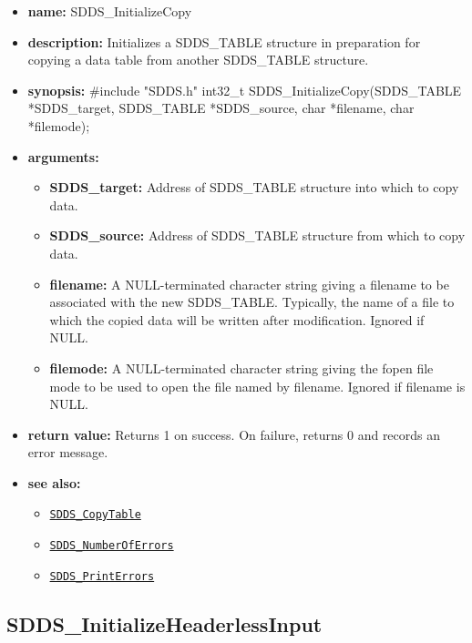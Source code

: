 \documentclass[11pt]{article}
\newcommand{\progref}[1]{\hyperref[SDDS_#1]{\tt SDDS\_#1}}
\begin{document}
\begin{itemize}
\item {\bf name:}\newline
SDDS\_InitializeCopy
\item {\bf description:}\newline
Initializes a SDDS\_TABLE structure in preparation for copying a data table from another SDDS\_TABLE structure.
\item {\bf synopsis:} \#include "SDDS.h"\newline
int32\_t SDDS\_InitializeCopy(SDDS\_TABLE *SDDS\_target, SDDS\_TABLE *SDDS\_source, char *filename, char *filemode);
\item {\bf arguments:}
\begin{itemize}
\item {\bf SDDS\_target:} Address of SDDS\_TABLE structure into which to copy data.
\item {\bf SDDS\_source:} Address of SDDS\_TABLE structure from which to copy data.
\item {\bf filename:} A NULL-terminated character string giving a filename to be associated with the new SDDS\_TABLE. Typically, the name of a file to which the copied data will be written after modification. Ignored if NULL.
\item {\bf filemode:} A NULL-terminated character string giving the fopen file mode to be used to open the file named by filename. Ignored if filename is NULL.
\end{itemize}
\item {\bf return value:}\newline
Returns 1 on success. On failure, returns 0 and records an error message.
\item {\bf see also:}
\begin{itemize}
\item \progref{CopyTable}
\item \progref{NumberOfErrors}
\item \progref{PrintErrors}
\end{itemize}
\end{itemize}

\subsection{SDDS\_InitializeHeaderlessInput}
\label{SDDS_InitializeHeaderlessInput}
\end{document}
